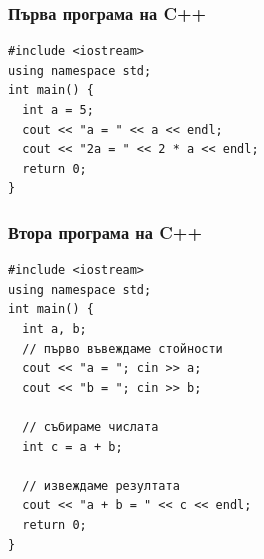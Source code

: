 \documentclass[alsotrans]{beamerswitch}
\begin{document}
\begin{frame}[fragile]
  \frametitle{Първа програма на C++}
  \begin{lstlisting}
#include <iostream>
using namespace std;
int main() {
  int a = 5;
  cout << "a = " << a << endl;
  cout << "2a = " << 2 * a << endl;
  return 0;
}
  \end{lstlisting}
\end{frame}

\begin{frame}[fragile]
  \frametitle{Втора програма на C++}
\begin{lstlisting}
#include <iostream>
using namespace std;
int main() {
  int a, b;
  // първо въвеждаме стойности
  cout << "a = "; cin >> a;
  cout << "b = "; cin >> b;

  // събираме числата
  int c = a + b;

  // извеждаме резултата
  cout << "a + b = " << c << endl;
  return 0;
}
\end{lstlisting}
\end{frame}
\end{document}
